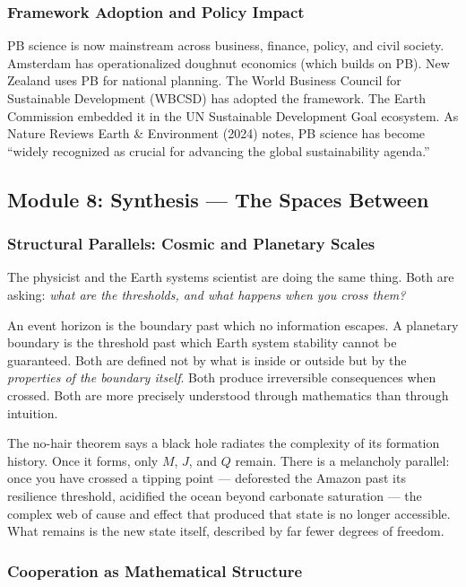 \documentclass[11pt,letterpaper]{article}
\begin{document}
\subsubsection{Framework Adoption and Policy Impact}

PB science is now mainstream across business, finance, policy, and civil society. Amsterdam has operationalized doughnut economics (which builds on PB). New Zealand uses PB for national planning. The World Business Council for Sustainable Development (WBCSD) has adopted the framework. The Earth Commission embedded it in the UN Sustainable Development Goal ecosystem. As Nature Reviews Earth \& Environment (2024) notes, PB science has become ``widely recognized as crucial for advancing the global sustainability agenda.''

\subsection{Module 8: Synthesis --- The Spaces Between}

\subsubsection{Structural Parallels: Cosmic and Planetary Scales}

The physicist and the Earth systems scientist are doing the same thing. Both are asking: \textit{what are the thresholds, and what happens when you cross them?}

An event horizon is the boundary past which no information escapes. A planetary boundary is the threshold past which Earth system stability cannot be guaranteed. Both are defined not by what is inside or outside but by the \textit{properties of the boundary itself}. Both produce irreversible consequences when crossed. Both are more precisely understood through mathematics than through intuition.

The no-hair theorem says a black hole radiates the complexity of its formation history. Once it forms, only $M$, $J$, and $Q$ remain. There is a melancholy parallel: once you have crossed a tipping point --- deforested the Amazon past its resilience threshold, acidified the ocean beyond carbonate saturation --- the complex web of cause and effect that produced that state is no longer accessible. What remains is the new state itself, described by far fewer degrees of freedom.

\subsubsection{Cooperation as Mathematical Structure}
\end{document}
